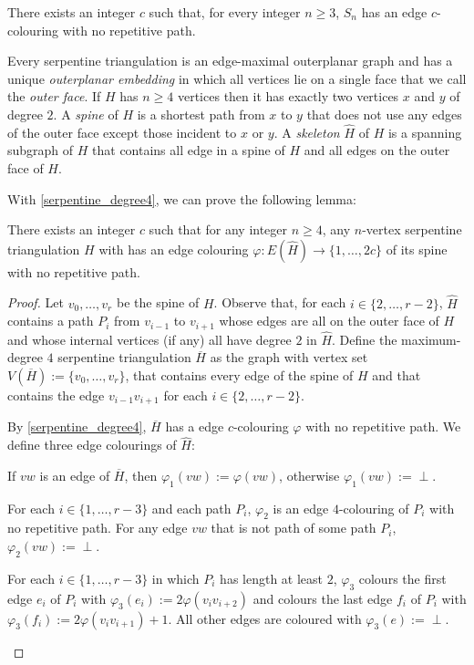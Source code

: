 \documentclass[kpfonts]{patmorin}
\begin{document}
\begin{lem}\label{serpentine_degree4}
    There exists an integer $c$ such that, for every integer $n\ge 3$, $S_n$ has an edge $c$-colouring with no repetitive path.
\end{lem}

Every serpentine triangulation is an edge-maximal outerplanar graph and has a unique \emph{outerplanar embedding} in which all vertices lie on a single face that we call the \emph{outer face}.  If $H$ has $n\ge 4$ vertices then it has exactly two vertices $x$ and $y$ of degree $2$.  A \emph{spine} of $H$ is a shortest path from $x$ to $y$ that does not use any edges of the outer face except those incident to $x$ or $y$. A \emph{skeleton} $\hat{H}$ of $H$ is a spanning subgraph of $H$ that contains all edge in a spine of $H$ and all edges on the outer face of $H$.

With \cref{serpentine_degree4}, we can prove the following lemma:

\begin{lem}\label{spine_colouring}
    There exists an integer $c$ such that for any integer $n\ge 4$, any $n$-vertex serpentine triangulation $H$ with  has an edge colouring $\varphi:E(\hat{H})\to\{1,\ldots,2c\}$ of its spine with no repetitive path.
\end{lem}

\begin{proof}
    Let $v_0,\ldots,v_r$ be the spine of $H$. Observe that, for each $i\in\{2,\ldots,r-2\}$, $\hat{H}$ contains a path $P_i$ from $v_{i-1}$ to $v_{i+1}$ whose edges are all on the outer face of $H$ and whose internal vertices (if any) all have degree $2$ in $\hat{H}$.   Define the maximum-degree $4$ serpentine triangulation $\overline{H}$ as the graph with vertex set $V(\overline{H}):=\{v_0,\ldots,v_r\}$, that contains every edge of the spine of $H$ and that contains the edge $v_{i-1}v_{i+1}$ for each $i\in\{2,\ldots,r-2\}$.

    By \cref{serpentine_degree4}, $\overline{H}$ has a edge $c$-colouring $\varphi$ with no repetitive path.  We define three edge colourings of $\hat{H}$:
    \begin{compactenum}[$\varphi_1$:]
        \item If $vw$ is an edge of $\overline{H}$, then $\varphi_1(vw):=\varphi(vw)$, otherwise $\varphi_1(vw):=\perp$.
        \item For each $i\in\{1,\ldots,r-3\}$ and each path $P_i$, $\varphi_2$ is an edge $4$-colouring of $P_i$ with no repetitive path.  For any edge $vw$ that is not path of some path $P_i$, $\varphi_2(vw):=\perp$.
        \item For each $i\in\{1,\ldots,r-3\}$ in which $P_i$ has length at least $2$, $\varphi_3$ colours the first edge $e_i$ of $P_i$ with $\varphi_3(e_i):=2\varphi(v_iv_{i+2})$ and colours the last edge $f_i$ of $P_i$ with $\varphi_3(f_i):=2\varphi(v_iv_{i+1})+1$.  All other edges are coloured with $\varphi_3(e):=\perp$.
    \end{compactenum}
\end{proof}
\end{document}
